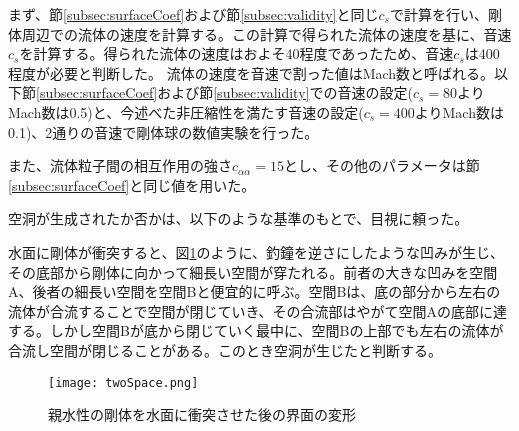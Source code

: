 \documentclass[]{jsarticle}
\begin{document}
まず、節\ref{subsec:surfaceCoef}および節\ref{subsec:validity}と同じ$c_s$で計算を行い、剛体周辺での流体の速度を計算する。この計算で得られた流体の速度を基に、音速$c_s$を計算する。得られた流体の速度はおよそ40程度であったため、音速$c_s$は400程度が必要と判断した。
流体の速度を音速で割った値はMach数と呼ばれる。以下節\ref{subsec:surfaceCoef}および節\ref{subsec:validity}での音速の設定($c_s=80$よりMach数は0.5)と、今述べた非圧縮性を満たす音速の設定($c_s=400$よりMach数は0.1)、2通りの音速で剛体球の数値実験を行った。

また、流体粒子間の相互作用の強さ$c_{\alpha\alpha}=15$とし、その他のパラメータは節\ref{subsec:surfaceCoef}と同じ値を用いた。

空洞が生成されたか否かは、以下のような基準のもとで、目視に頼った。

水面に剛体が衝突すると、図\ref{fig:twoSpace}のように、釣鐘を逆さにしたような凹みが生じ、その底部から剛体に向かって細長い空間が穿たれる。前者の大きな凹みを空間A、後者の細長い空間を空間Bと便宜的に呼ぶ。空間Bは、底の部分から左右の流体が合流することで空間が閉じていき、その合流部はやがて空間Aの底部に達する。しかし空間Bが底から閉じていく最中に、空間Bの上部でも左右の流体が合流し空間が閉じることがある。このとき空洞が生じたと判断する。
\begin{figure}[H]
  \centering
  \texttt{[image: twoSpace.png]}
  \caption{親水性の剛体を水面に衝突させた後の界面の変形\label{fig:twoSpace} }
\end{figure}
\end{document}

